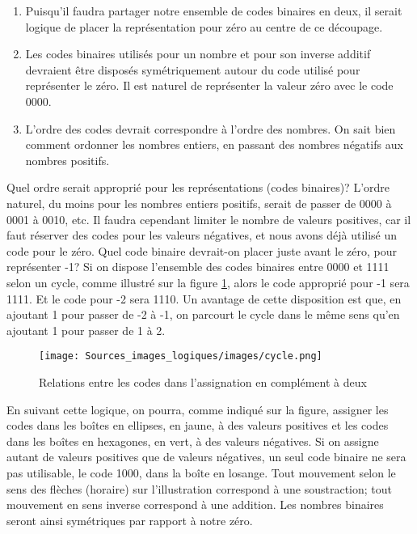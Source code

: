\documentclass[11pt]{article}
\begin{document}
\begin{enumerate}
\item Puisqu'il faudra partager notre ensemble de codes binaires en deux,
il serait logique de placer la représentation pour zéro au centre
de ce découpage.

\item Les codes binaires utilisés pour un nombre et pour son inverse
additif devraient être disposés symétriquement autour du code
utilisé pour représenter le zéro. Il est naturel de représenter la
valeur zéro avec le code 0000.

\item L'ordre des codes devrait correspondre à l'ordre des nombres. On
sait bien comment ordonner les nombres entiers, en passant des
nombres négatifs aux nombres positifs.
\end{enumerate}

Quel ordre serait approprié pour les représentations (codes binaires)?
L'ordre naturel, du moins pour les nombres entiers positifs, serait de
passer de 0000 à 0001 à 0010, etc. Il faudra cependant limiter le
nombre de valeurs positives, car il faut réserver des codes pour les
valeurs négatives, et nous avons déjà utilisé un code pour le
zéro. Quel code binaire devrait-on placer juste avant le zéro, pour
représenter -1? Si on dispose l'ensemble des codes binaires entre 0000
et 1111 selon un cycle, comme illustré sur la figure
\ref{fig:org854b66b}, alors le code approprié pour -1 sera 1111. Et le
code pour -2 sera 1110. Un avantage de cette disposition est que, en
ajoutant 1 pour passer de -2 à -1, on parcourt le cycle dans le même
sens qu'en ajoutant 1 pour passer de 1 à 2.

\begin{figure}[htbp]
\centering
\texttt{[image: Sources\_images\_logiques/images/cycle.png]}
\caption{\label{fig:org854b66b}Relations entre les codes dans l'assignation en complément à deux}
\end{figure}

En suivant cette logique, on pourra, comme indiqué sur la figure,
assigner les codes dans les boîtes en ellipses, en jaune, à des
valeurs positives et les codes dans les boîtes en hexagones, en vert,
à des valeurs négatives. Si on assigne autant de valeurs positives que
de valeurs négatives, un seul code binaire ne sera pas utilisable, le
code 1000, dans la boîte en losange. Tout mouvement selon le sens des
flèches (horaire) sur l'illustration correspond à une soustraction;
tout mouvement en sens inverse correspond à une addition. Les nombres
binaires seront ainsi symétriques par rapport à notre zéro.
\end{document}
